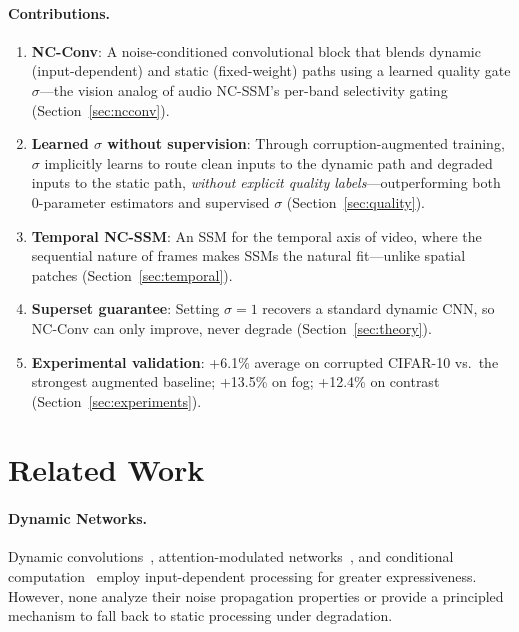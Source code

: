 \documentclass[10pt,twocolumn,letterpaper]{article}
\begin{document}
\paragraph{Contributions.}
\begin{enumerate}
\setlength\itemsep{0pt}
\item \textbf{NC-Conv}: A noise-conditioned convolutional block that blends dynamic (input-dependent) and static (fixed-weight) paths using a learned quality gate $\sigma$---the vision analog of audio NC-SSM's per-band selectivity gating (Section~\ref{sec:ncconv}).
\item \textbf{Learned $\sigma$ without supervision}: Through corruption-augmented training, $\sigma$ implicitly learns to route clean inputs to the dynamic path and degraded inputs to the static path, \emph{without explicit quality labels}---outperforming both 0-parameter estimators and supervised $\sigma$ (Section~\ref{sec:quality}).
\item \textbf{Temporal NC-SSM}: An SSM for the temporal axis of video, where the sequential nature of frames makes SSMs the natural fit---unlike spatial patches (Section~\ref{sec:temporal}).
\item \textbf{Superset guarantee}: Setting $\sigma=1$ recovers a standard dynamic CNN, so NC-Conv can only improve, never degrade (Section~\ref{sec:theory}).
\item \textbf{Experimental validation}: +6.1\% average on corrupted CIFAR-10 vs.\ the strongest augmented baseline; +13.5\% on fog; +12.4\% on contrast (Section~\ref{sec:experiments}).
\end{enumerate}


\section{Related Work}
\label{sec:related}

\paragraph{Dynamic Networks.}
Dynamic convolutions~\cite{chen2020dynamic}, attention-modulated networks~\cite{hu2018squeeze}, and conditional computation~\cite{bengio2013estimating} employ input-dependent processing for greater expressiveness.
However, none analyze their noise propagation properties or provide a principled mechanism to fall back to static processing under degradation.
\end{document}
